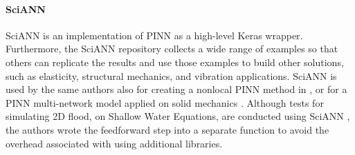 \documentclass[pdflatex,sn-basic]{sn-jnl}%
\theoremstyle{thmstyleone}%
\theoremstyle{thmstyletwo}%
\theoremstyle{thmstylethree}%
\begin{document}
\paragraph{SciANN}  %
SciANN \citep{Hag2021_SciannKerastensorflowWrapper_JuaHJ} is an implementation of PINN as a high-level Keras wrapper.
Furthermore, the SciANN repository collects a wide range of examples so that others can replicate the results and use those examples to build other solutions, such as elasticity, structural mechanics, and vibration applications. 
%
%
SciANN is used by the same authors also for  creating a  nonlocal PINN method in \cite{Hag2021_NonlocalPhysicsInformed_BekHBMJ}, or
for a PINN multi-network model applied on solid mechanics \citep{Hag2021_PhysicsInformedDeep_RaiHRM}.
%
Although tests for simulating 2D flood, on Shallow Water Equations, are conducted using SciANN 
\citep{Jam2021_MachineLearningAccelerating_HagJHI}, the authors wrote the feedforward step into a separate function to avoid the overhead associated with using additional libraries. 
\end{document}

